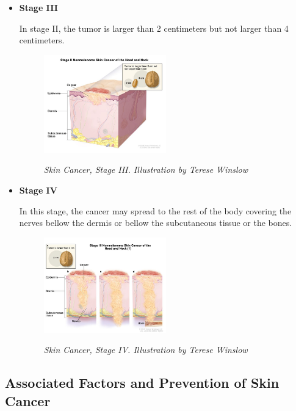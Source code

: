 \begin{itemize}
  \item \textbf{Stage III}

    In stage II, the tumor is larger than 2 centimeters but not larger than 4
    centimeters.

    \begin{figure}[H] \centering
      \includegraphics[width=0.5\textwidth]{imatges/problem_domain/stage2-skin-cancer.jpg}
      \caption[Skin Cancer, Stage III]{\textit{Skin Cancer, Stage III.
      Illustration by Terese Winslow}} {\label{fig:stage2-skin-canceer}}
    \end{figure}

    \newpage

  \item \textbf{Stage IV}

    In this stage, the cancer may spread to the rest of the body covering the
    nerves bellow the dermis or bellow the subcutaneous tissue or the bones.

    \begin{figure}[H] \centering
      \includegraphics[width=0.5\textwidth]{imatges/problem_domain/stage3-skin-cancer.jpg}
      \caption[Skin Cancer, Stage IV]{\textit{Skin Cancer, Stage IV. Illustration by
    Terese Winslow}} {\label{fig:stage3-skin-canceer}} \end{figure}

\end{itemize}

\subsection{Associated Factors and Prevention of Skin Cancer}

